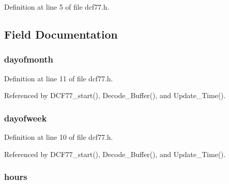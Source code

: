 Definition at line 5 of file dcf77.\-h.



\subsection{Field Documentation}
\hypertarget{struct_time___date___format_af980355fa766196214d34395ebed0a89}{
\subsubsection[{dayofmonth}]{ dayofmonth}}\label{struct_time___date___format_af980355fa766196214d34395ebed0a89}


Definition at line 11 of file dcf77.\-h.



Referenced by D\-C\-F77\-\_\-start(), Decode\-\_\-\-Buffer(), and Update\-\_\-\-Time().

\hypertarget{struct_time___date___format_a97419c23eb9097f89c83ce342df499f8}{
\subsubsection[{dayofweek}]{ dayofweek}}\label{struct_time___date___format_a97419c23eb9097f89c83ce342df499f8}


Definition at line 10 of file dcf77.\-h.



Referenced by D\-C\-F77\-\_\-start(), Decode\-\_\-\-Buffer(), and Update\-\_\-\-Time().

\hypertarget{struct_time___date___format_af8ebb6bc008ed8d3be395faf75ec1ebc}{
\subsubsection[{hours}]{ hours}}\label{struct_time___date___format_af8ebb6bc008ed8d3be395faf75ec1ebc}


